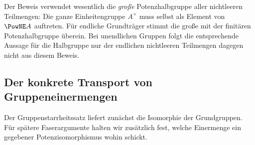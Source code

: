 \documentclass[main.tex]{subfiles}
\begin{document}
\begin{remark}
Der Beweis verwendet wesentlich die \emph{große} Potenzhalbgruppe aller
nichtleeren Teilmengen: Die ganze Einheitengruppe \(A^\times\) muss selbst
als Element von \(\PowNE A\) auftreten.  Für endliche Grundträger stimmt
die große mit der finitären Potenzhalbgruppe überein.  Bei unendlichen
Gruppen folgt die entsprechende Aussage für die Halbgruppe nur der
endlichen nichtleeren Teilmengen dagegen nicht aus diesem Beweis.
\end{remark}

\subsection{Der konkrete Transport von Gruppeneinermengen}

Der Gruppenstarrheitssatz liefert zunächst die Isomorphie der Grundgruppen.
Für spätere Faserargumente halten wir zusätzlich fest, welche Einermenge
ein gegebener Potenzisomorphismus wohin schickt.

\begin{tabproof}
\end{tabproof}
\end{document}
